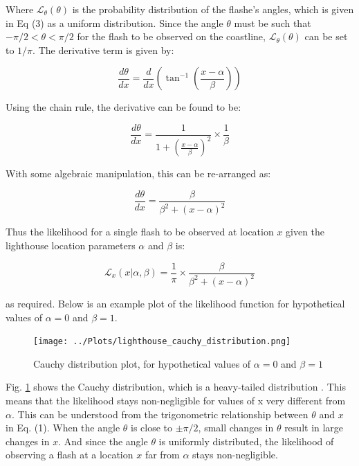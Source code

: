 \documentclass[12pt]{report} %
\begin{document}
Where $\mathcal{L}_{\theta}(\theta)$ is the probability distribution of the flashe's angles, which is given in Eq (3) as a uniform distribution. Since the angle $\theta$ must be such that $-\pi/2 < \theta < \pi/2$ for the flash to be observed on the coastline, $\mathcal{L}_{\theta}(\theta)$ can be set to $1/\pi$. The derivative term is given by:

\begin{equation}
    \frac{d\theta}{dx} = \frac{d}{dx} (\tan^{-1}\left(\frac{x - \alpha}{\beta}\right) )
\end{equation}

Using the chain rule, the derivative can be found to be:

\begin{equation}
    \frac{d\theta}{dx} = \frac{1}{1 + \left(\frac{x - \alpha}{\beta}\right)^{2}} \times \frac{1}{\beta}
\end{equation}

With some algebraic manipulation, this can be re-arranged as:

\begin{equation}
    \frac{d\theta}{dx} = \frac{\beta}{\beta^{2} + (x - \alpha)^{2}}
\end{equation}

Thus the likelihood for a single flash to be observed at location $x$ given the lighthouse location parameters $\alpha$ and $\beta$ is:

\begin{equation}
    \mathcal{L}_{x}(x|\alpha, \beta) = \frac{1}{\pi} \times \frac{\beta}{\beta^{2} + (x - \alpha)^{2}}
\end{equation}

as required. Below is an example plot of the likelihood function for hypothetical values of $\alpha = 0$ and $\beta = 1$.

\begin{figure}[h]
\centering
\texttt{[image: ../Plots/lighthouse\_cauchy\_distribution.png]}
\caption{Cauchy distribution plot, for hypothetical values of $\alpha = 0$ and $\beta = 1$}
\label{fig:cauchy_distribution}
\end{figure}

Fig. \ref{fig:cauchy_distribution} shows the Cauchy distribution, which is a heavy-tailed distribution \cite[p34]{sivia_data_analysis} \cite[p84]{FJames2006}. This means that the likelihood stays non-negligible for values of x very different from $\alpha$. This can be understood from the trigonometric relationship between $\theta$ and $x$ in Eq. (1). When the angle $\theta$ is close to $\pm \pi/2$, small changes in $\theta$ result in large changes in $x$. And since the angle $\theta$ is uniformly distributed, the likelihood of observing a flash at a location $x$ far from $\alpha$ stays non-negligible.
\end{document}
